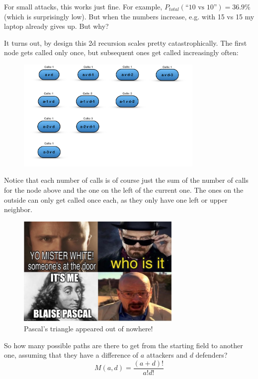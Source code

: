 \documentclass[11pt,a4paper]{article}
\begin{document}
    For small attacks, this works just fine.
    For example, $P_{total}(\text{``10 vs 10''}) = 36.9\%$ (which is surprisingly low).
    But when the numbers increase, e.g. with 15 vs 15 my laptop already gives up.
    But why?

    It turns out, by design this 2d recursion scales pretty catastrophically.
    The first node gets called only once, but subsequent ones get called increasingly often:

    \begin{figure}[H]
        \centering
        \includegraphics[width=0.8\textwidth]{../images/Pascal.png}
    \end{figure}

    Notice that each number of calls is of course just the sum of the number of calls for the node above and the one on the left of the current one.
    The ones on the outside can only get called once each, as they only have one left or upper neighbor.

    \begin{figure}[H]
        \centering
        \includegraphics[width=0.7\textwidth]{../images/pascale meme2.jpg}
        \caption*{Pascal's triangle appeared out of nowhere!}
    \end{figure}

    So how many possible paths are there to get from the starting field to another one, assuming that they have a difference of $a$ attackers and $d$ defenders?
    \[ M(a, d) = \frac{(a + d)!}{a! d!} \]
\end{document}

